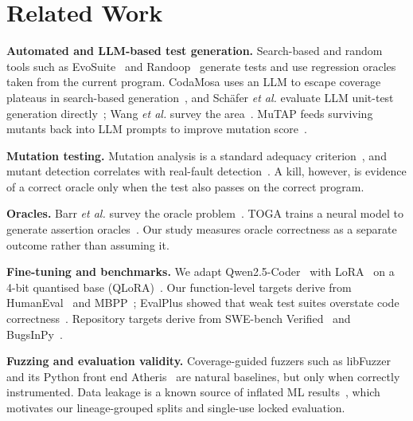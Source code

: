 \documentclass[conference,a4paper]{IEEEtran}
\begin{document}
\section{Related Work}

\textbf{Automated and LLM-based test generation.} Search-based and random tools such
as EvoSuite~\cite{fraser2011evosuite} and Randoop~\cite{pacheco2007randoop} generate
tests and use regression oracles taken from the current program. CodaMosa uses an LLM
to escape coverage plateaus in search-based generation~\cite{lemieux2023codamosa}, and
Sch\"afer \emph{et al.} evaluate LLM unit-test generation directly~\cite{schafer2024llmunit};
Wang \emph{et al.} survey the area~\cite{wang2024testingsurvey}. MuTAP feeds surviving
mutants back into LLM prompts to improve mutation score~\cite{dakhel2024mutap}.

\textbf{Mutation testing.} Mutation analysis is a standard adequacy
criterion~\cite{jia2011mutation,papadakis2019mutation}, and mutant detection
correlates with real-fault detection~\cite{just2014mutants}. A kill, however, is
evidence of a correct oracle only when the test also passes on the correct program.

\textbf{Oracles.} Barr \emph{et al.} survey the oracle problem~\cite{barr2015oracle}.
TOGA trains a neural model to generate assertion oracles~\cite{dinella2022toga}. Our
study measures oracle correctness as a separate outcome rather than assuming it.

\textbf{Fine-tuning and benchmarks.} We adapt Qwen2.5-Coder~\cite{hui2024qwen25coder}
with LoRA~\cite{hu2021lora} on a 4-bit quantised base (QLoRA)~\cite{dettmers2023qlora}.
Our function-level targets derive from HumanEval~\cite{chen2021codex} and
MBPP~\cite{austin2021mbpp}; EvalPlus showed that weak test suites overstate code
correctness~\cite{liu2023evalplus}. Repository targets derive from SWE-bench
Verified~\cite{jimenez2023swebench} and BugsInPy~\cite{widyasari2020bugsinpy}.

\textbf{Fuzzing and evaluation validity.} Coverage-guided fuzzers such as
libFuzzer~\cite{serebryany2016libfuzzer} and its Python front end
Atheris~\cite{atheris} are natural baselines, but only when correctly instrumented.
Data leakage is a known source of inflated ML results~\cite{kapoor2023leakage}, which
motivates our lineage-grouped splits and single-use locked evaluation.

\end{document}
